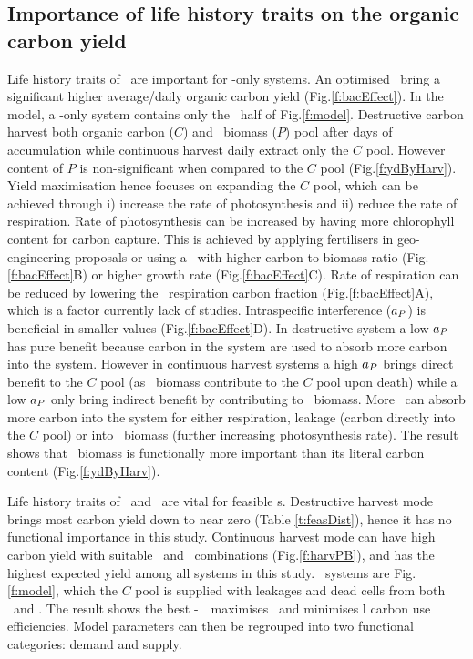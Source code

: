 \documentclass[../thesis.tex]{subfiles} %
\begin{document}
\subsection{Importance of life history traits on the organic carbon yield}
Life history traits of \phy\ are important for \phy-only systems. An optimised \phy\ bring a significant higher average/daily organic carbon yield (Fig.\ref{f:bacEffect}).  In the model, a \phy-only system contains only the \phy\ half of Fig.\ref{f:model}.  Destructive carbon harvest both organic carbon ($C$) and \phy\ biomass ($P$) pool after days of accumulation while continuous harvest daily extract only the $C$ pool.  However content of $P$ is non-significant when compared to the $C$ pool (Fig.\ref{f:ydByHarv}).  Yield maximisation hence focuses on expanding the $C$ pool, which can be achieved through \Rn{1}) increase the rate of photosynthesis and \Rn{2}) reduce the rate of respiration.  Rate of photosynthesis can be increased by having more chlorophyll content for carbon capture.  This is achieved by applying fertilisers in geo-engineering proposals \autocite{gnanadesikan2008export,lawrence2014efficiency,trick2010iron,kwiatkowski2015atmospheric,lovelock2007ocean} or using a \phy\ with higher carbon-to-biomass ratio (Fig.\ref{f:bacEffect}B) or higher growth rate (Fig.\ref{f:bacEffect}C).  Rate of respiration can be reduced by lowering the \phy\ respiration carbon fraction (Fig.\ref{f:bacEffect}A), which is a factor currently lack of studies.  Intraspecific interference ($a_P$) is beneficial in smaller values (Fig.\ref{f:bacEffect}D).  In destructive system a low $a_P$ has pure benefit because carbon in the system are used to absorb more carbon into the system.  However in continuous harvest systems a high $a_P$ brings direct benefit to the $C$ pool (as \phy\ biomass contribute to the $C$ pool upon death) while a low $a_P$ only bring indirect benefit by contributing to \phy\ biomass.  More \phy\ can absorb more carbon into the system for either respiration, leakage (carbon directly into the $C$ pool) or into \phy\ biomass (further increasing photosynthesis rate).  The result shows that \phy\ biomass is functionally more important than its literal carbon content (Fig.\ref{f:ydByHarv}).

Life history traits of \phy\ and \bac\ are vital for feasible \pbs s.  Destructive harvest mode brings most carbon yield down to near zero (Table \ref{t:feasDist}), hence it has no functional importance in this study.  Continuous harvest mode can have high carbon yield with suitable \phy\ and \bac\ combinations (Fig.\ref{f:harvPB}), and has the highest expected yield among all systems in this study.  \PBH\ systems are Fig.\ref{f:model}, which the $C$ pool is supplied with leakages and dead cells from both \phy\ and \bac.  The result shows the best \phy-\bac\ \pbs\ maximises \phy\ and minimises \bac l carbon use efficiencies.  Model parameters can then be regrouped into two functional categories: demand and supply.
\end{document}
